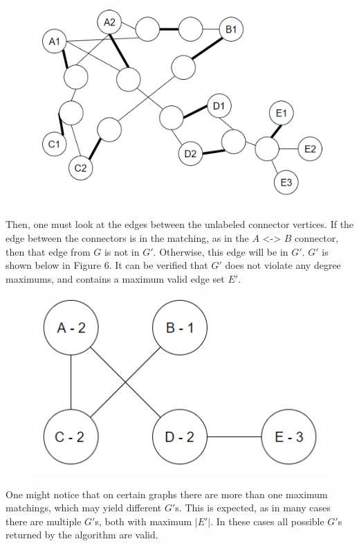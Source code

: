 \documentclass{article}
\begin{document}
		\begin{figure}[H]
		\caption{}
		\includegraphics{Figure5}
	\end{figure}
		 		\vbox{%
	Then, one must look at the edges between the unlabeled connector vertices. If the edge between the connectors is in the matching, as in the $A$ <-> $B$ connector, then that edge from $G$ is not in $G'$. Otherwise, this edge will be in $G'$. $G'$ is shown below in Figure 6. It can be verified that $G'$ does not violate any degree maximums, and contains a maximum valid edge set $E'$.
}
	\begin{figure}[H]
		\caption{}
		\includegraphics{Figure6}
	\end{figure}

	One might notice that on certain graphs there are more than one maximum matchings, which may yield different $G'$s. This is expected, as in many cases there are multiple $G'$s, both with maximum $|E'|$. In these cases all possible $G'$s returned by the algorithm are valid.

	\newtheorem{theorem}{Theorem}
\end{document}
